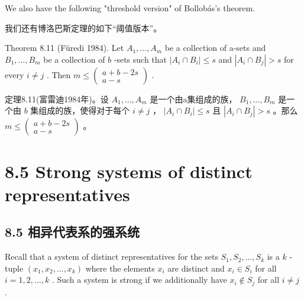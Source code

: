 \documentclass[10pt]{article}
\begin{document}
We also have the following "threshold version" of Bollobás's theorem.

\begin{tcolorbox}\relax
我们还有博洛巴斯定理的如下“阈值版本”。
\end{tcolorbox}

Theorem 8.11 (Füredi 1984). Let \({A}_{1},\ldots ,{A}_{m}\) be a collection of a-sets and \({B}_{1},\ldots ,{B}_{m}\) be a collection of \(b\) -sets such that \(\left| {{A}_{i} \cap  {B}_{i}}\right|  \leq  s\) and \(\left| {{A}_{i} \cap  {B}_{j}}\right|  > s\) for every \(i \neq  j\) . Then \(m \leq  \left( \begin{matrix} a + b - {2s} \\  a - s \end{matrix}\right)\) .

\begin{tcolorbox}\relax
定理8.11(富雷迪1984年)。设 \({A}_{1},\ldots ,{A}_{m}\) 是一个由a集组成的族， \({B}_{1},\ldots ,{B}_{m}\) 是一个由 \(b\) 集组成的族，使得对于每个 \(i \neq  j\) ， \(\left| {{A}_{i} \cap  {B}_{i}}\right|  \leq  s\) 且 \(\left| {{A}_{i} \cap  {B}_{j}}\right|  > s\) 。那么 \(m \leq  \left( \begin{matrix} a + b - {2s} \\  a - s \end{matrix}\right)\) 。
\end{tcolorbox}

\section*{8.5 Strong systems of distinct representatives}

\begin{tcolorbox}\relax
\section*{8.5 相异代表系的强系统}
\end{tcolorbox}

Recall that a system of distinct representatives for the sets \({S}_{1},{S}_{2},\ldots ,{S}_{k}\) is a \(k\) -tuple \(\left( {{x}_{1},{x}_{2},\ldots ,{x}_{k}}\right)\) where the elements \({x}_{i}\) are distinct and \({x}_{i} \in  {S}_{i}\) for all \(i = 1,2,\ldots ,k\) . Such a system is strong if we additionally have \({x}_{i} \notin  {S}_{j}\) for all \(i \neq  j\) .
\end{document}
